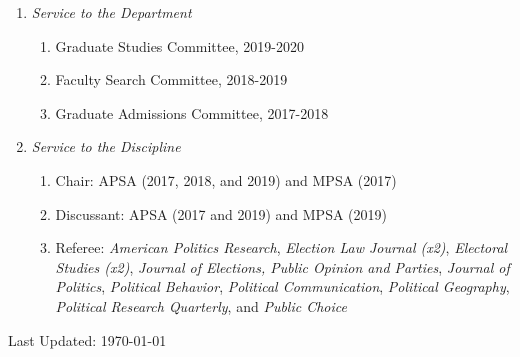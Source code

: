 \documentclass[11pt]{article}
\def\footerlink{}
\begin{document}
\begin{enumerate}[topsep = 0pt, itemsep = -1ex, partopsep  = 1ex, parsep = 1ex]
	
	\item[] \textit{Service to the Department}
	
	\begin{enumerate}[topsep = 0pt, itemsep = -1ex, partopsep = -1ex, parsep = 1ex]
		
		\item[] Graduate Studies Committee, 2019-2020
		\item[] Faculty Search Committee, 2018-2019 
		\item[] Graduate Admissions Committee, 2017-2018 \\
		
	\end{enumerate}

	\item[] \textit{Service to the Discipline}

	\begin{enumerate}[topsep = 0pt, itemsep = -1ex, partopsep  = -1ex, parsep = 1ex]
	
	\item[] Chair: APSA (2017, 2018, and 2019) and MPSA (2017)
	
	\item[] Discussant: APSA (2017 and 2019) and MPSA (2019)
	
	\item[] Referee: \textit{American Politics Research}, \textit{Election Law Journal (x2)}, \textit{Electoral Studies (x2)}, \textit{Journal of Elections, Public Opinion and Parties}, \textit{Journal of Politics}, \textit{Political Behavior}, \textit{Political Communication}, \textit{Political Geography}, \textit{Political Research Quarterly}, and \textit{Public Choice} \\
	
	\end{enumerate}

\end{enumerate}

\bigskip

\begin{center}
  \begin{footnotesize}
    Last Updated: \today \\
    \href{\footerlink}{\texttt{\footerlink}}
  \end{footnotesize}
\end{center}
\end{document}
